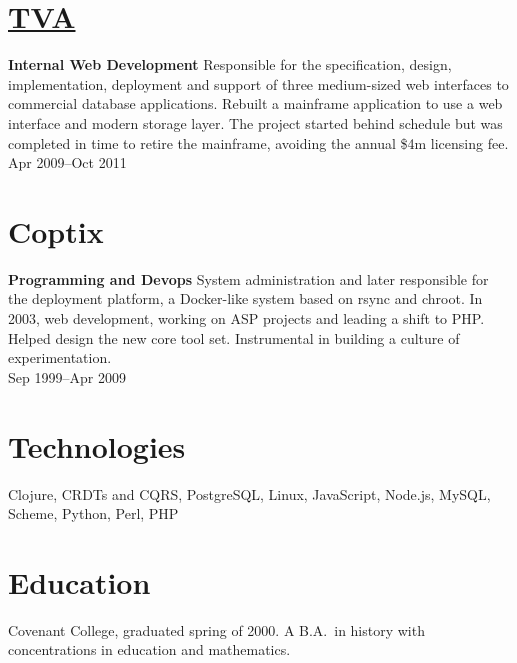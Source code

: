 \documentclass[margin]{res}
\begin{document}
\begin{resume}
\section{\href{http://tva.gov/}{TVA}}
{\bf Internal Web Development}
%
Responsible for the specification, design, implementation, deployment
and support of three medium-sized web interfaces to commercial
database applications. Rebuilt a mainframe application to use a web
interface and modern storage layer. The project started behind
schedule but was completed in time to retire the mainframe, avoiding
the annual \$4m licensing fee.\\
%
Apr 2009--Oct 2011

\section{Coptix}
{\bf Programming and Devops}
%
System administration and later responsible for the deployment
platform, a Docker-like system based on rsync and chroot. In 2003, web
development, working on ASP projects and leading a shift to PHP.
Helped design the new core tool set. Instrumental in building a
culture of experimentation.\\
%
Sep 1999--Apr 2009

\section{Technologies}

Clojure, CRDTs and CQRS, PostgreSQL, Linux, JavaScript, Node.js,
MySQL, Scheme, Python, Perl, PHP

\section{Education}

Covenant College, graduated spring of 2000. A B.A.\ in history with
concentrations in education and mathematics.

\end{resume}
\end{document}
